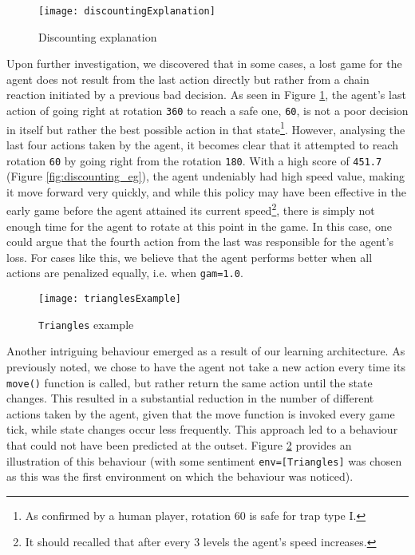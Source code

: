 \begin{figure}[h]
    \centering
    \texttt{[image: discountingExplanation]}
    \caption{Discounting explanation}
    \label{fig:discounting_expl}
\end{figure}

Upon further investigation, we discovered that in some cases, a lost game for the agent does not result from the last action directly but rather from a chain reaction initiated by a previous bad decision. As seen in Figure \ref{fig:discounting_expl}, the agent's last action of going right at rotation \texttt{360} to reach a safe one, \texttt{60}, is not a poor decision in itself but rather the best possible action in that state\footnote{As confirmed by a human player, rotation 60 is safe for trap type I.}. However, analysing the last four actions taken by the agent, it becomes clear that it attempted to reach rotation \texttt{60} by going right from the rotation \texttt{180}. With a high score of \texttt{451.7} (Figure \ref{fig:discounting_eg}), the agent undeniably had high speed value, making it move forward very quickly, and while this policy may have been effective in the early game before the agent attained its current speed\footnote{It should recalled that after every 3 levels the agent's speed increases.}, there is simply not enough time for the agent to rotate at this point in the game. In this case, one could argue that the fourth action from the last was responsible for the agent's loss. For cases like this, we believe that the agent performs better when all actions are penalized equally, i.e. when \texttt{gam=1.0}.

\begin{figure}[h]
    \centering
    \texttt{[image: trianglesExample]}
    \caption{\texttt{Triangles} example}
    \label{fig:triangles_intbeh_eg}
\end{figure}

Another intriguing behaviour emerged as a result of our learning architecture. As previously noted, we chose to have the agent not take a new action every time its \texttt{move()} function is called, but rather return the same action until the state changes. This resulted in a substantial reduction in the number of different actions taken by the agent, given that the move function is invoked every game tick, while state changes occur less frequently. This approach led to a behaviour that could not have been predicted at the outset. Figure \ref{fig:triangles_intbeh_eg} provides an illustration of this behaviour (with some sentiment \texttt{env=[Triangles]} was chosen as this was the first environment on which the behaviour was noticed).

